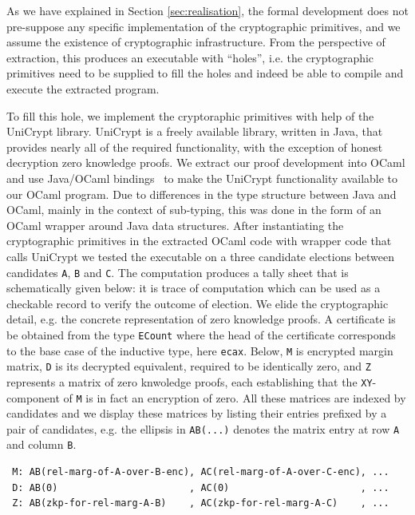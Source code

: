 As we have explained in Section \ref{sec:realisation}, the formal
development does not pre-suppose any specific implementation of the
cryptographic primitives, and we assume the existence of
cryptographic infrastructure. From the perspective of extraction,
this produces an executable with ``holes'', i.e. the cryptographic
primitives need to be supplied to fill the holes and indeed be able
to compile and execute the extracted program.  

To fill this hole, we implement the cryptoraphic primitives with
help of the UniCrypt library\cite{LocherH14}.
UniCrypt is a freely available library, written in Java,  that provides nearly all of
the required functionality, with the exception of honest decryption
zero knowledge proofs.  We extract our proof development into OCaml
and use Java/OCaml bindings~\cite{OCamlJava} to make the UniCrypt
functionality available to our OCaml program. Due to differences
in the type structure between Java and OCaml, mainly in the context
of sub-typing, this was done in the form of an OCaml wrapper around
Java data structures. 
 After instantiating the  
 cryptographic primitives in the extracted OCaml code with wrapper
 code that calls UniCrypt
 we tested the executable on a three candidate elections between
 candidates \texttt{A}, \texttt{B} and \texttt{C}.
 The computation produces a tally sheet that is schematically given
 below:
 it is trace of computation which can be used as a checkable record to verify
 the outcome of election. We elide the cryptographic detail, e.g.
 the concrete representation of zero knowledge proofs.
 A certificate
 is be obtained from the type \texttt{ECount} where the head
 of the certificate corresponds to the base case of the inductive
 type, here \texttt{ecax}. Below, \texttt{M} is encrypted margin
 matrix, \texttt{D} is its decrypted equivalent, required to be
 identically zero, and \texttt{Z} represents a matrix of zero
 knwoledge proofs, each establishing that the \texttt{XY}-component
 of \texttt{M} is in fact an encryption of zero. All these matrices
 are indexed by candidates and we display these matrices by listing
 their entries prefixed by a pair of candidates, e.g. the ellipsis
 in \texttt{AB(...)} denotes the matrix entry at row \texttt{A} and
column \texttt{B}.
{\small
 \begin{verbatim}
 M: AB(rel-marg-of-A-over-B-enc), AC(rel-marg-of-A-over-C-enc), ... 
 D: AB(0)                       , AC(0)                       , ...
 Z: AB(zkp-for-rel-marg-A-B)    , AC(zkp-for-rel-marg-A-C)    , ...
 \end{verbatim}}
 
